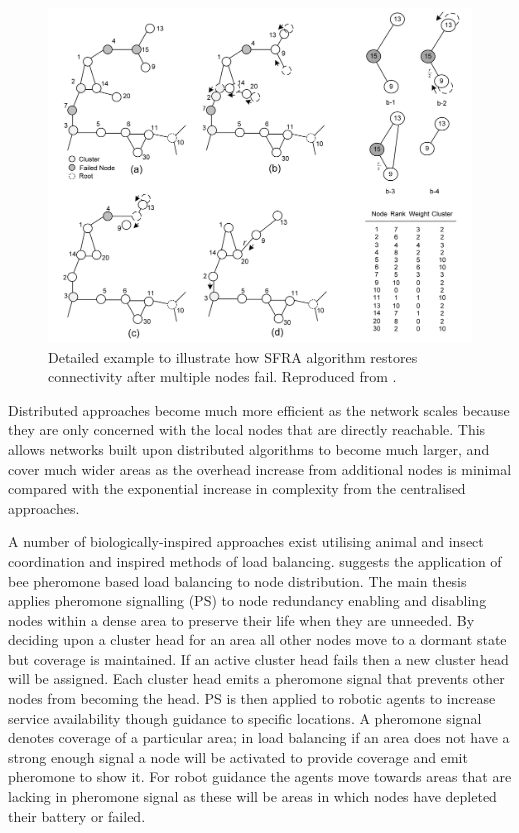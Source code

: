 \documentclass[authoryearcitations]{UoYCSproject}
\begin{document}
\begin{figure}
 \centering
    \includegraphics[width=\textwidth]{figures/sfra.png}
    \caption[Detailed example to illustrate how SFRA algorithm restores connectivity after multiple nodes fail.]{Detailed example to illustrate how SFRA algorithm restores connectivity after multiple nodes fail. Reproduced from \citet{Alfadhly2012}.}
    \label{fig:sfra}
\end{figure}

Distributed approaches become much more efficient as the network scales because they are only concerned with the local nodes that are directly reachable. This allows networks built upon distributed algorithms to become much larger, and cover much wider areas as the overhead increase from additional nodes is minimal compared with the exponential increase in complexity from the centralised approaches.

A number of biologically-inspired approaches exist utilising animal and insect coordination and inspired methods of load balancing. \citet{Caliskanelli2014} suggests the application of bee pheromone based load balancing to node distribution. The main thesis applies pheromone signalling (PS) to node redundancy enabling and disabling nodes within a dense area to preserve their life when they are unneeded. By deciding upon a cluster head for an area all other nodes move to a dormant state but coverage is maintained. If an active cluster head fails then a new cluster head will be assigned. Each cluster head emits a pheromone signal that prevents other nodes from becoming the head. PS is then applied to robotic agents to increase service availability though guidance to specific locations. A pheromone signal denotes coverage of a particular area; in load balancing if an area does not have a strong enough signal a node will be activated to provide coverage and emit pheromone to show it. For robot guidance the agents move towards areas that are lacking in pheromone signal as these will be areas in which nodes have depleted their battery or failed.
\end{document}
